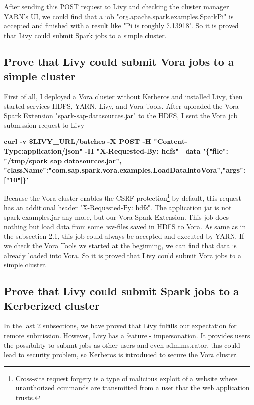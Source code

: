 \documentclass[article,colorback,accentcolor=tud4c]{tudreport}
\begin{document}
	After sending this POST request to Livy and checking the cluster manager YARN's UI, we could find that a job "org.apache.spark.examples.SparkPi" is accepted and finished with a result like "Pi is roughly 3.13918". So it is proved that Livy could submit Spark jobs to a simple cluster.
		
	\subsection{Prove that Livy could submit Vora jobs to a simple cluster}
	
	First of all, I deployed a Vora cluster without Kerberos and installed Livy, then started services HDFS, YARN, Livy, and Vora Tools. After uploaded the Vora Spark Extension "spark-sap-datasources.jar" to the HDFS, I sent the Vora job submission request to Livy:
	
	\noindent\textbf{curl -v \$LIVY\_URL/batches -X POST -H "Content-Type:application/json" -H "X-Requested-By: hdfs" --data '\{"file": "/tmp/spark-sap-datasources.jar", "className":"com.sap.spark.vora.examples.LoadDataIntoVora","args":["10"]\}'}
	
	Because the Vora cluster enables the CSRF protection\footnote{Cross-site request forgery is a type of malicious exploit of a website where unauthorized commands are transmitted from a user that the web application trusts.\cite{csrf}} by default, this request has an additional header "X-Requested-By: hdfs". The application jar is not spark-examples.jar any more, but our Vora Spark Extension. This job does nothing but load data from some csv-files saved in HDFS to Vora. As same as in the subsection 2.1, this job could always be accepted and executed by YARN. If we check the Vora Tools we started at the beginning, we can find that data is already loaded into Vora. So it is proved that Livy could submit Vora jobs to a simple cluster.
		
	\subsection{Prove that Livy could submit Spark jobs to a Kerberized cluster}
	
	In the last 2 subsections, we have proved that Livy fulfills our expectation for remote submission. However, Livy has a feature - impersonation. It provides users the possibility to submit jobs as other users and even administrator, this could lead to security problem, so Kerberos is introduced to secure the Vora cluster.
	
\end{document}

